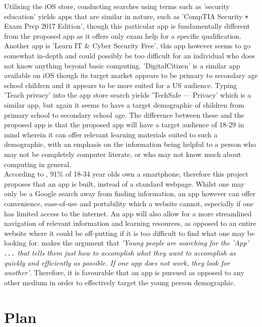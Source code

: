 \documentclass{article}
\begin{document}
Utilising the iOS store, conducting searches using terms such as 'security education' yields apps that are similar in nature, such as 'CompTIA Security {\texttt{+}} Exam Prep 2017 Edition', though this particular app is fundamentally different from the proposed app as it offers only exam help for a specific qualification. Another app is 'Learn IT \& Cyber Security Free', this app however seems to go somewhat in-depth and could possibly be too difficult for an individual who does not know anything beyond basic computing. 'DigitalCitizen' is a similar app available on iOS though its target market appears to be primary to secondary age school children and it appears to be more suited for a US audience. Typing 'Teach privacy' into the app store search yields 'TechSafe --- Privacy' which is a similar app, but again it seems to have a target demographic of children from primary school to secondary school age. The difference between these and the proposed app is that the proposed app will have a target audience of 18-29 in mind wherein it can offer relevant learning materials suited to such a demographic, with an emphasis on the information being helpful to a person who may not be completely computer literate, or who may not know much about computing in general. \\
\indent According to \cite{street_mobile_2017}, 91\% of 18-34 year olds own a smartphone, therefore this project proposes that an app is built, instead of a standard webpage. Whilst one may only be a Google search away from finding information, an app however can offer convenience, ease-of-use and portability which a website cannot, especially if one has limited access to the internet. An app will also allow for a more streamlined navigation of relevant information and learning resources, as opposed to an entire website where it could be off-putting if it is too difficult to find what one may be looking for. \cite{noauthor_talking_nodate} makes the argument that \textit{'Young people are searching for the 'App' {\texttt{...}} that tells them just how to accomplish what they want to accomplish as quickly and efficiently as possible. If one app does not work, they look for another'}. Therefore, it is favourable that an app is pursued as opposed to any other medium in order to effectively target the young person demographic.

\section{Plan}
\end{document}
